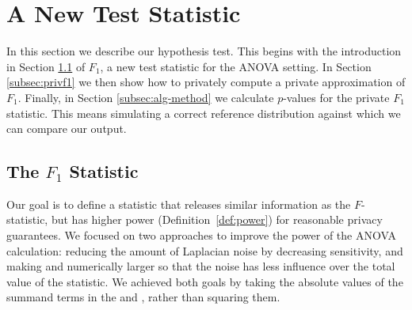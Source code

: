 \section{A New Test Statistic}\label{sec:f1}

In this section we describe our hypothesis test.  This begins with the introduction in Section \ref{subsec:f1def} of $F_1$, a new test statistic for the ANOVA setting.  In Section \ref{subsec:privf1} we then show how to privately compute a private approximation of $F_1$.  Finally, in Section \ref{subsec:alg-method} we calculate $p$-values for the private $F_1$ statistic.  This means simulating a correct reference distribution against which we can compare our output.


\subsection{The $F_1$ Statistic}\label{subsec:f1def}


Our goal is to define a statistic that releases similar information as the $F$-statistic, but has higher power (Definition~\ref{def:power}) for reasonable privacy guarantees.  We focused on two approaches to improve the power of the ANOVA calculation: reducing the amount of Laplacian noise by decreasing sensitivity, and making \ssa and \sse numerically larger so that the noise has less influence over the total value of the statistic.  We achieved both goals by taking the absolute values of the summand terms in the \ssa and \sse, rather than squaring them. 

